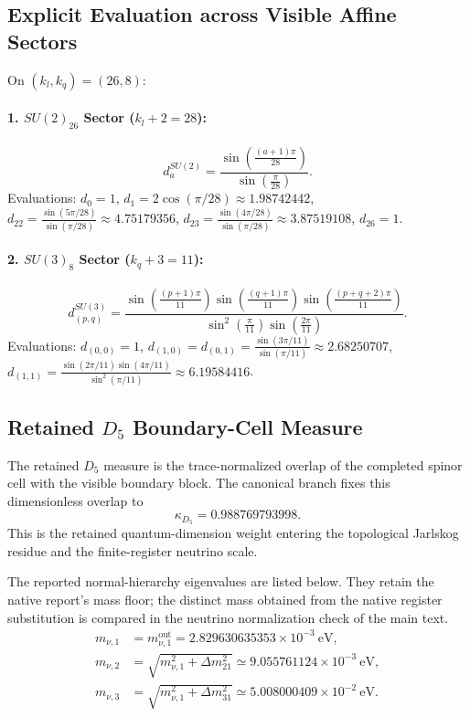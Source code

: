 \documentclass[11pt]{article}
\theoremstyle{plain}
\newcommand{\kappad}{\kappa_{D_5}}
\begin{document}
\subsection{Explicit Evaluation across Visible Affine Sectors}
On $(k_l, k_q) = (26, 8)$:

\paragraph{1. $SU(2)_{26}$ Sector ($k_l + 2 = 28$):}
\begin{equation}
d_a^{SU(2)} = \frac{\sin\left( \frac{(a+1)\pi}{28} \right)}{\sin\left( \frac{\pi}{28} \right)}.
\end{equation}
Evaluations: $d_0 = 1$, $d_1 = 2 \cos(\pi/28) \approx 1.98742442$, $d_{22} = \frac{\sin(5\pi/28)}{\sin(\pi/28)} \approx 4.75179356$, $d_{23} = \frac{\sin(4\pi/28)}{\sin(\pi/28)} \approx 3.87519108$, $d_{26} = 1$.

\paragraph{2. $SU(3)_8$ Sector ($k_q + 3 = 11$):}
\begin{equation}
d_{(p,q)}^{SU(3)} = \frac{\sin\left(\frac{(p+1)\pi}{11}\right) \sin\left(\frac{(q+1)\pi}{11}\right) \sin\left(\frac{(p+q+2)\pi}{11}\right)}{\sin^2\left(\frac{\pi}{11}\right) \sin\left(\frac{2\pi}{11}\right)}.
\end{equation}
Evaluations: $d_{(0,0)} = 1$, $d_{(1,0)} = d_{(0,1)} = \frac{\sin(3\pi/11)}{\sin(\pi/11)} \approx 2.68250707$, $d_{(1,1)} = \frac{\sin(2\pi/11) \sin(4\pi/11)}{\sin^2(\pi/11)} \approx 6.19584416$.

\subsection{Retained \texorpdfstring{$D_5$}{D5} Boundary-Cell Measure}
The retained $D_5$ measure is the trace-normalized overlap of the completed
spinor cell with the visible boundary block.  The canonical branch fixes this
dimensionless overlap to
\begin{equation}
\label{eq:kappa-d5-measure}
 \boxed{
 \kappad
 =0.988769793998.}
\end{equation}
This is the retained quantum-dimension weight entering the topological
Jarlskog residue and the finite-register neutrino scale.

The reported normal-hierarchy eigenvalues are listed below.  They retain the
native report's mass floor; the distinct mass obtained from the native
register substitution is compared in the neutrino
normalization check of the main text.
\begin{align}
\label{eq:supplement-lightest-neutrino}
 m_{\nu,1}
 &=
 m_{\nu,1}^{\text{out}}
 =
 2.829630635353\times10^{-3}\ \mathrm{eV},\\
 m_{\nu,2}
 &=
 \sqrt{m_{\nu,1}^2+\Delta m_{21}^2}
 \simeq
 9.055761124\times10^{-3}\ \mathrm{eV},\nonumber\\
\label{eq:supplement-third-neutrino}
 m_{\nu,3}
 &=
 \sqrt{m_{\nu,1}^2+\Delta m_{31}^2}
 \simeq
 5.008000409\times10^{-2}\ \mathrm{eV}.
\end{align}
\end{document}
